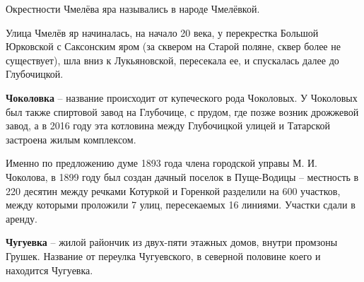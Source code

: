 Окрестности Чмелёва яра назывались в народе Чмелёвкой.

Улица Чмелёв яр начиналась, на начало 20 века, у перекрестка Большой Юрковской с Саксонским яром (за сквером на Старой поляне, сквер более не существует), шла вниз к Лукьяновской, пересекала ее, и спускалась далее до Глубочицкой.\\


\medskip


\textbf{Чоколовка} – название происходит от купеческого рода Чоколовых. У Чоколовых был также спиртовой завод на Глубочице, с прудом, где позже возник дрожжевой завод, а в 2016 году эта котловина между Глубочицкой улицей и Татарской застроена жилым комплексом.

Именно по предложению думе 1893 года члена городской управы М. И. Чоколова, в 1899 году был создан дачный поселок в Пуще-Водицы – местность в 220 десятин между речками Котуркой и Горенкой разделили на 600 участков, между которыми проложили 7 улиц, пересекаемых 16 линиями. Участки сдали в аренду.\\

\medskip


\textbf{Чугуевка} – жилой райончик из двух-пяти этажных домов, внутри промзоны Грушек. Название от переулка Чугуевского, в северной половине коего и находится Чугуевка.